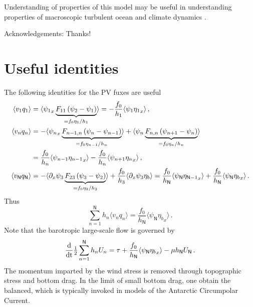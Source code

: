 \documentclass{jfm}
\def\beq{\begin{equation}}
\def\eeq{\end{equation}}
\newcommand{\com}{\, ,}
\newcommand{\per}{\, .}
\newcommand{\avxy}[1]{\langle{#1}\rangle}
\newcommand{\nmax}{\mathsf{N}}
\newcommand{\dd}{\rm d}
\newcommand{\half}{\tfrac{1}{2}}
\begin{document}
Understanding of properties of this model may be useful  in understanding
properties of macroscopic turbulent ocean and climate dynamics \citep{held2005}.


Acknowledgements: Thanks!

\clearpage

\appendix

\section{Useful identities}
The following identities for the PV fuxes are useful
\begin{align}
\label{pvfluxes}
\avxy{v_1 q_1} &=  \avxy{{\psi_1}_x \underbrace{F_{11}\left(\psi_2 -
\psi_1\right)}_{=f_0 \eta_1/h_1}} = -\frac{f_0}{h_1}  \avxy{\psi_1 {\eta_1}_x}
\nonumber \com \\
\avxy{v_n q_n} &= -\avxy{{\psi_n}_x \underbrace{F_{n-1,n}\left(\psi_n -\psi_{n-1}
\right)}_{=f_0 \eta_{n-1}/h_n}}  + \avxy{\psi_n \underbrace{F_{n,n}\left(\psi_{n+1}
-\psi_n\right)}_{=f_0 \eta_{n}/h_n}} \nonumber \\&=
\frac{f_0}{h_n}\avxy{\psi_{n-1} {\eta_{n-1}}_x}
- \frac{f_0}{h_n}\avxy{\psi_{n+1} {\eta_n}_x}\com \nonumber \\
\avxy{v_\nmax q_\nmax} &=  -\avxy{\p_x \psi_3 \underbrace{F_{23}\left(\psi_3 -
\psi_2\right)}_{=f_0 \eta_2/h_3}} + \frac{f_0}{h_3}\avxy{\p_x \psi_3 \eta_b}=
\frac{f_0}{h_\nmax} \avxy{\psi_\nmax {\eta_{\nmax-1}}_x} + \frac{f_0}{h_\nmax}
\avxy{\psi_\nmax {\eta_b}_x}\per
\end{align}
Thus
\beq
\label{pvfluxes_sum}
\sum_{n=1}^\nmax  h_n \avxy{v_n q_n} = \frac{f_0}{h_\nmax}\avxy{\psi_\nmax
{\eta_b}_x} \per
\eeq
Note that the barotropic large-scale flow is governed by
\beq \label{Ubtt}
\frac{\dd}{\dd t}\half \sum_{n=1}^{\nmax}h_n U_n = \tau
+ \frac{f_0}{h_\nmax}\avxy{\psi_\nmax
{\eta_b}_x} - \mu h_\nmax U_{\nmax}\per
\eeq
The momentum imparted by the  wind stress is removed through topographic stress
and bottom drag. In the limit of small bottom drag, one obtain the \cite{munk_palmen1951}
 balanced, which is typically invoked in models of the Antarctic Circumpolar
Current.
\end{document}
